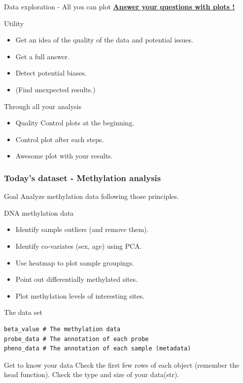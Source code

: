 \documentclass[10pt]{beamer}
\newenvironment{xframe}[2][]
  {\begin{frame}[fragile,environment=xframe,#1]
  \frametitle{#2}}
  {\end{frame}}
\begin{document}
\begin{frame}{Data exploration - All you can plot}
  \centering
  \uline{{\bf Answer your questions with plots !}}
  \medskip

  \begin{block}{Utility}
    \begin{itemize}
    \item Get an idea of the quality of the data and potential issues.
    \item Get a full answer.
    \item Detect potential biases.
    \item (Find unexpected results.)
    \end{itemize}
  \end{block}
  
  \begin{block}{Through all your analysis}
    \begin{itemize}
    \item Quality Control plots at the beginning.
    \item Control plot after each steps.
    \item Awesome plot with your results.
    \end{itemize}
  \end{block}
\end{frame}


\begin{xframe}[shrink=5]{Today's dataset - Methylation analysis}
  \begin{block}{Goal}
    Analyze methylation data following those principles. 
  \end{block}
  \begin{block}{DNA methylation data}
    \begin{itemize}
    \item Identify sample outliers (and remove them).
    \item Identify co-variates (sex, age) using PCA.
    \item Use heatmap to plot sample groupings.
    \item Point out differentially methylated sites.
    \item Plot methylation levels of interesting sites.
    \end{itemize}
  \end{block}
  \begin{exampleblock}{The data set}
\begin{verbatim}
beta_value # The methylation data
probe_data # The annotation of each probe
pheno_data # The annotation of each sample (metadata)
\end{verbatim}  
  \end{exampleblock}
  \begin{exampleblock}{Get to know your data}
    Check the first few rows of each object (remember the {\sf head} function). Check the type and size of your data({\sf str}).
  \end{exampleblock}
\end{xframe}
\end{document}

